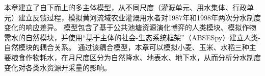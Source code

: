 
本章建立了自下而上的多主体模型，从不同尺度（灌溉单元、用水集体、行政单元）建立反馈过程，模拟黄河流域农业灌溉用水者对1987年和1998年两次分水制度变化的响应差异。
模型包含了基于公共池塘资源演化博弈的人类模块、模拟作物需水的自然模块，并使用“基于主体的社会-生态系统框架”（ABSESpy）建立人类-自然模块的耦合关系。
通过该耦合模型，本章可以模拟小麦、玉米、水稻三种主要粮食作物耗水，在月尺度区分为自然降水、地表水、地下水，从而分析分水制度变化对各类水资源开采量的影响。
